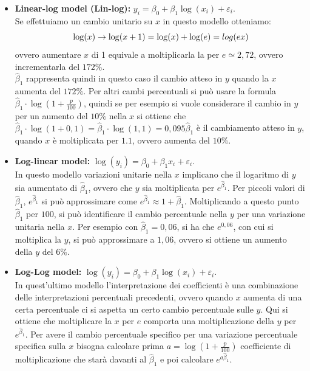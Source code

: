\begin{itemize}
	\item \textbf{Linear-log model (Lin-log):} $y_i = \beta_0 + \beta_1 \log(x_i) + \varepsilon_i$.\\
	Se effettuiamo un cambio unitario su $x$ in questo modello otteniamo:
	\begin{equation}
	\notag
		\log(x) \rightarrow \log(x+1) = \log(x) + \log(e) = log(ex)
	\end{equation}
	ovvero aumentare $x$ di 1 equivale a moltiplicarla la per $e \simeq 2,72$, ovvero incrementarla del $172\%$.\\
	$\hat{\beta}_1$ rappresenta quindi in questo caso il cambio atteso in $y$ quando la $x$ aumenta del $172\%$. Per altri cambi percentuali si può usare la formula $\hat{\beta}_1 \cdot \log(1 + \frac{p}{100})$, quindi se per esempio si vuole considerare il cambio in $y$ per un aumento del $10\%$ nella $x$ si ottiene che $\hat{\beta}_1 \cdot \log(1 + 0,1) = \hat{\beta}_1 \cdot \log(1,1) = 0,095 \hat{\beta}_1$ è il cambiamento atteso in $y$, quando $x$ è moltiplicata per $1.1$, ovvero aumenta del $10\%$.
	\item \textbf{Log-linear model:} $\log(y_i) = \beta_0 + \beta_1 x_i + \varepsilon_i$.\\
	In questo modello variazioni unitarie nella $x$ implicano che il logaritmo di $y$ sia aumentato di $\hat{\beta}_1$, ovvero che $y$ sia moltiplicata per $e^{\hat{\beta}_1}$. Per piccoli valori di $\hat{\beta}_1$, $e^{\hat{\beta}_1}$ si può approssimare come $e^{\hat{\beta}_1} \approx 1+\hat{\beta}_1$. Moltiplicando a questo punto $\hat{\beta}_1$ per $100$, si può identificare il cambio percentuale nella $y$ per una variazione unitaria nella $x$. Per esempio con $\hat{\beta}_1 = 0,06$, si ha che $e^{0,06}$, con cui si moltiplica la $y$, si può approssimare a $1,06$, ovvero si ottiene un aumento della $y$ del $6\%$. 
	\item \textbf{Log-Log model:} $\log(y_i) = \beta_0 + \beta_1 \log(x_i) + \varepsilon_i$.\\
	In quest'ultimo modello l'interpretazione dei coefficienti è una combinazione delle interpretazioni percentuali precedenti, ovvero quando $x$ aumenta di una certa percentuale ci si aspetta un certo cambio percentuale sulle $y$. Qui si ottiene che moltiplicare la $x$ per $e$ comporta una moltiplicazione della $y$ per $e^{\hat{\beta}_1}$. Per avere il cambio percentuale specifico per una variazione percentuale specifica sulla $x$ bisogna calcolare prima $a = \log(1+\frac{p}{100})$ coefficiente di moltiplicazione che starà davanti al $\hat{\beta}_1$ e poi calcolare $e^{a\hat{\beta}_1}$.
\end{itemize}

